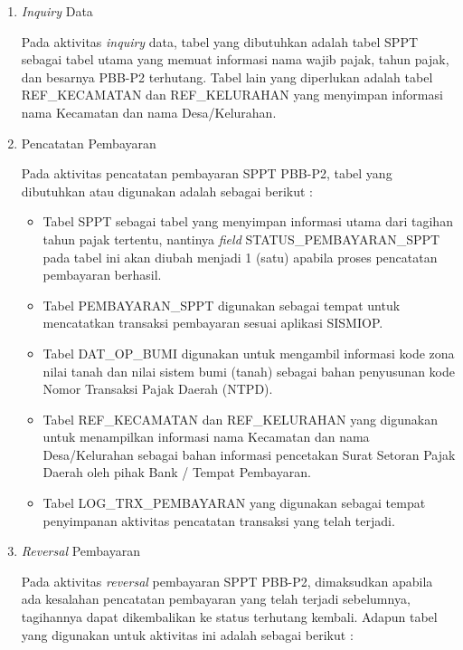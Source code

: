 \documentclass[pdftex,12pt, oneside]{article}
\begin{document}
\begin{enumerate}[1.]
	\item \textit{Inquiry} Data
	
	Pada aktivitas \textit{inquiry} data, tabel yang dibutuhkan adalah tabel SPPT sebagai tabel utama yang memuat informasi nama wajib pajak, tahun pajak, dan besarnya PBB-P2 terhutang. Tabel lain yang diperlukan adalah tabel REF\_KECAMATAN dan REF\_KELURAHAN yang menyimpan informasi nama Kecamatan dan nama Desa/Kelurahan. 
	
	\item Pencatatan Pembayaran
	
	Pada aktivitas pencatatan pembayaran SPPT PBB-P2, tabel yang dibutuhkan atau digunakan adalah sebagai berikut :
	
	\begin{itemize}
		\item Tabel SPPT sebagai tabel yang menyimpan informasi utama dari tagihan tahun pajak tertentu, nantinya \textit{field} STATUS\_PEMBAYARAN\_SPPT pada tabel ini akan diubah menjadi 1 (satu) apabila proses pencatatan pembayaran berhasil.
		\item Tabel PEMBAYARAN\_SPPT digunakan sebagai tempat untuk mencatatkan transaksi pembayaran sesuai aplikasi SISMIOP. 
		\item Tabel DAT\_OP\_BUMI digunakan untuk mengambil informasi kode zona nilai tanah dan nilai sistem bumi (tanah) sebagai bahan penyusunan kode Nomor Transaksi Pajak Daerah (NTPD).
		\item Tabel REF\_KECAMATAN dan REF\_KELURAHAN yang digunakan untuk menampilkan informasi nama Kecamatan dan nama Desa/Kelurahan sebagai bahan informasi pencetakan Surat Setoran Pajak Daerah oleh pihak Bank / Tempat Pembayaran.
		\item Tabel LOG\_TRX\_PEMBAYARAN yang digunakan sebagai tempat penyimpanan aktivitas pencatatan transaksi yang telah terjadi.
	\end{itemize} 
	
	\item \textit{Reversal} Pembayaran
	
	Pada aktivitas \textit{reversal} pembayaran SPPT PBB-P2, dimaksudkan apabila ada kesalahan pencatatan pembayaran yang telah terjadi sebelumnya, tagihannya dapat dikembalikan ke status terhutang kembali. Adapun tabel yang digunakan untuk aktivitas ini adalah sebagai berikut :
	

\end{enumerate}
\end{document}
